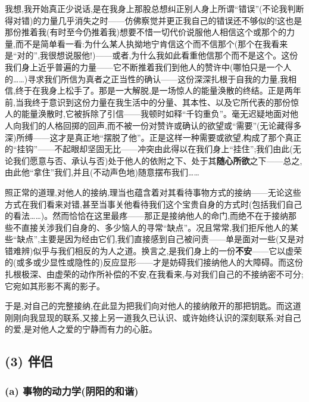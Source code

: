 我想,我开始真正少说话,是在我身上那股总想纠正别人身上所谓“错误”(不论我判断得对错)的力量几乎消失之时——仿佛察觉并更正我自己的错误还不够似的!这也是那份推着我(有时至今仍推着我)想要不惜一切代价说服他人相信这个或那个的力量,而不是简单看一看:为什么某人执拗地宁肯信这个而不信那个(那个在我看来是“对的”,我很想说服他!)——或者,为什么我如此看重他信那个而不是这个。这份我们身上近乎普遍的力量——它不断推着我们到他人的赞许中(哪怕只是一个人的……)寻求我们所信为真者之正当性的确认——这份深深扎根于自我的力量,我相信,终于在我身上松手了。那是一大解脱,是一场惊人的能量涣散的终结。正是两年前,当我终于意识到这份力量在我生活中的分量、其本性、以及它所代表的那份惊人的能量涣散时,它被拆除了引信——我顿时如释“千钧重负”。毫无迟疑地面对他人向我们的人格回掷的回声,而不被一份对赞许或确认的欲望或“需要”(无论藏得多深)所缚——这才是真正地“摆脱了他”。正是这样一种需要或欲望,构成了那个真正的“挂钩”——不起眼却坚固无比——冲突由此得以在我们身上“挂住”;我们由此(无论我们愿意与否、承认与否)处于他人的依附之下、处于其\dmark{}\textbf{随心所欲}之下——总之,由此他“拿住”我们,并且(不动声色地)随意摆布我们……

照正常的道理,对他人的接纳,理当也蕴含着对其看待事物方式的接纳——无论这些方式在我们看来对错,甚至当事关他看待我们这个宝贵自身的方式时(包括我们自己的看法……)。然而恰恰在这里最疼——那正是接纳他人的命门,而绝不在于接纳那些不直接关涉我们自身的、多少恼人的寻常“缺点”。况且常常,我们拒斥他人的某些“缺点”,主要是因为经由它们,我们直接感到自己被问责——单是面对一些(又是对错难辨)似乎与我们相反的为人之道。换言之,是我们身上的一份\textbf{不安}——它以虚荣的(或多或少显性或隐性的)反应显形——才是妨碍我们接纳他人的大障碍。而这份扎根极深、由虚荣的动作所补偿的不安,在我看来,与对我们自己的不接纳密不可分;它宛如其形影不离的影子。

于是,对自己的完整接纳,在此显为把我们向对他人的接纳敞开的那把钥匙。而这道刚刚向我显现的联系,又接上另一道我久已认识、或许始终认识的深刻联系:对自己的爱,是对他人之爱的宁静而有力的心脏。

\subsection{(3) 伴侣}
\label{ch18:local:h11}

\subsubsection*{(a) 事物的动力学(阴阳的和谐)}
\label{ch18:local:h12}

\label{ch18:local:n11}

